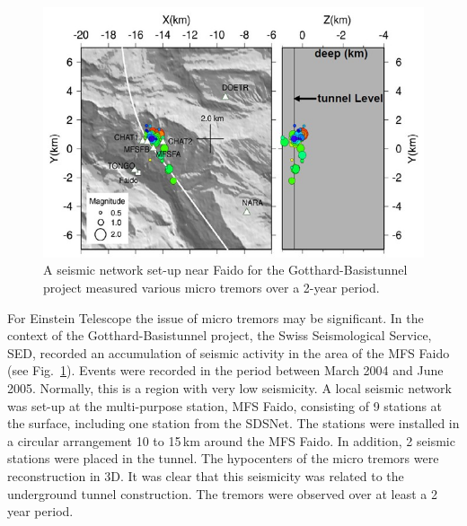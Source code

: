 \begin{figure}[htbp!]
\centering
\includegraphics[width=12cm]{./Sec_SiteInfra/Figures/faido.jpg}
\caption{A seismic network set-up near Faido for the Gotthard-Basistunnel project
measured various micro tremors over a 2-year period.}
\label{fig:faido}
\end{figure}
For Einstein Telescope the issue of micro tremors may be significant. In the context of the
Gotthard-Basistunnel project, the Swiss Seismological Service, SED, recorded an
accumulation of seismic activity in the area of the MFS Faido (see Fig.~\ref{fig:faido}). 
Events were recorded in the period between March 2004 and June 2005. Normally, this
is a region with very low seismicity. A local seismic network was set-up at the 
multi-purpose station, MFS Faido, consisting of 9 stations at the surface, including one station from the
SDSNet. The stations were installed in a circular arrangement 10 to 15\,km
around the MFS Faido. In addition, 2 seismic stations were placed in the tunnel.
The hypocenters of the micro tremors were reconstruction in 3D. It was
clear that this seismicity was related to the underground tunnel construction.
The tremors were observed over at least a 2 year period.

